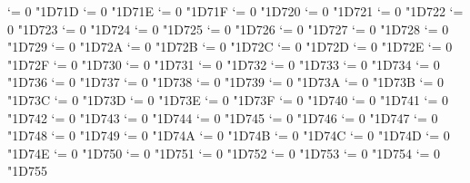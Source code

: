 {  \Umathcode `\Β = 0 \unimathfam "1D71D
  \Umathcode `\Γ = 0 \unimathfam "1D71E
  \Umathcode `\Δ = 0 \unimathfam "1D71F
  \Umathcode `\Ε = 0 \unimathfam "1D720
  \Umathcode `\Ζ = 0 \unimathfam "1D721
  \Umathcode `\Η = 0 \unimathfam "1D722
  \Umathcode `\Θ = 0 \unimathfam "1D723
  \Umathcode `\Ι = 0 \unimathfam "1D724
  \Umathcode `\Κ = 0 \unimathfam "1D725
  \Umathcode `\Λ = 0 \unimathfam "1D726
  \Umathcode `\Μ = 0 \unimathfam "1D727
  \Umathcode `\Ν = 0 \unimathfam "1D728
  \Umathcode `\Ξ = 0 \unimathfam "1D729
  \Umathcode `\Ο = 0 \unimathfam "1D72A
  \Umathcode `\Π = 0 \unimathfam "1D72B
  \Umathcode `\Ρ = 0 \unimathfam "1D72C
  \Umathcode `\ϴ = 0 \unimathfam "1D72D
  \Umathcode `\Σ = 0 \unimathfam "1D72E
  \Umathcode `\Τ = 0 \unimathfam "1D72F
  \Umathcode `\Υ = 0 \unimathfam "1D730
  \Umathcode `\Φ = 0 \unimathfam "1D731
  \Umathcode `\Χ = 0 \unimathfam "1D732
  \Umathcode `\Ψ = 0 \unimathfam "1D733
  \Umathcode `\Ω = 0 \unimathfam "1D734
  \Umathcode `\α = 0 \unimathfam "1D736
  \Umathcode `\β = 0 \unimathfam "1D737
  \Umathcode `\γ = 0 \unimathfam "1D738
  \Umathcode `\δ = 0 \unimathfam "1D739
  \Umathcode `\ε = 0 \unimathfam "1D73A
  \Umathcode `\ζ = 0 \unimathfam "1D73B
  \Umathcode `\η = 0 \unimathfam "1D73C
  \Umathcode `\θ = 0 \unimathfam "1D73D
  \Umathcode `\ι = 0 \unimathfam "1D73E
  \Umathcode `\κ = 0 \unimathfam "1D73F
  \Umathcode `\λ = 0 \unimathfam "1D740
  \Umathcode `\μ = 0 \unimathfam "1D741
  \Umathcode `\ν = 0 \unimathfam "1D742
  \Umathcode `\ξ = 0 \unimathfam "1D743
  \Umathcode `\ο = 0 \unimathfam "1D744
  \Umathcode `\π = 0 \unimathfam "1D745
  \Umathcode `\ρ = 0 \unimathfam "1D746
  \Umathcode `\ς = 0 \unimathfam "1D747
  \Umathcode `\σ = 0 \unimathfam "1D748
  \Umathcode `\τ = 0 \unimathfam "1D749
  \Umathcode `\υ = 0 \unimathfam "1D74A
  \Umathcode `\ϕ = 0 \unimathfam "1D74B
  \Umathcode `\χ = 0 \unimathfam "1D74C
  \Umathcode `\ψ = 0 \unimathfam "1D74D
  \Umathcode `\ω = 0 \unimathfam "1D74E
  \Umathcode `\ϵ = 0 \unimathfam "1D750
  \Umathcode `\ϑ = 0 \unimathfam "1D751
  \Umathcode `\ϰ = 0 \unimathfam "1D752
  \Umathcode `\φ = 0 \unimathfam "1D753
  \Umathcode `\ϱ = 0 \unimathfam "1D754
  \Umathcode `\ϖ = 0 \unimathfam "1D755
\fi
\tenbfit}
\let\itbf=\bfit

